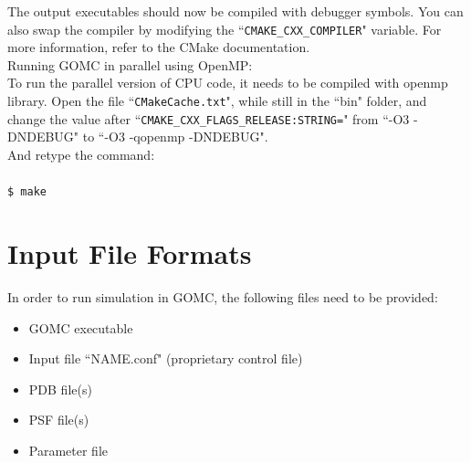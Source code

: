 The output executables should now be compiled with debugger symbols.
You can also swap the compiler by modifying the ``\texttt{CMAKE\_CXX\_COMPILER}" variable. For more information, refer to the CMake documentation.\\
Running GOMC in parallel using OpenMP:\\
To run the parallel version of CPU code, it needs to be compiled with openmp library. Open the file ``\texttt{CMakeCache.txt}", while still in the ``bin" folder, and change the value after ``\texttt{CMAKE\_CXX\_FLAGS\_RELEASE:STRING=}" from ``-O3 -DNDEBUG" to ``-O3 -qopenmp -DNDEBUG".\\
And retype the command:\\\\
\texttt{\$ make}
\newpage

\section{Input File Formats}
In order to run simulation in GOMC, the following files need to be provided:
\begin{itemize}
\item GOMC executable
\item Input file ``NAME.conf" (proprietary control file)
\item PDB file(s)
\item PSF file(s)
\item Parameter file
\end{itemize}
